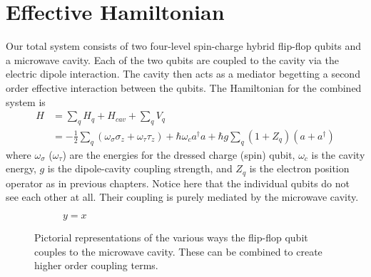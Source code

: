 \section{Effective Hamiltonian}\label{SEC:cavity_ham}

Our total system consists of two four-level spin-charge hybrid flip-flop qubits and a microwave cavity.
Each of the two qubits are coupled to the cavity via the electric dipole interaction.
The cavity then acts as a mediator begetting a second order effective interaction between the qubits.
The Hamiltonian for the combined system is
\begin{align}\label{EQ:cavity_hamiltonian}
    H & = \sum_q H_q + H_{cav} + \sum_q V_q \nonumber                                                                                        \\
      & = -\frac{1}{2}\sum_q (\omega_\sigma \sigma_z + \omega_\tau \tau_z) + \hbar\omega_c a^\dagger a + \hbar g \sum_q (1+Z_q)(a+a^\dagger)
\end{align}
where $\omega_\sigma$ ($\omega_\tau$) are the energies for the dressed charge (spin) qubit, $\omega_c$ is the cavity energy, $g$ is the dipole-cavity coupling strength, and $Z_q$ is the electron position operator as in previous chapters.
Notice here that the individual qubits do not see each other at all.
Their coupling is purely mediated by the microwave cavity.

\begin{figure}[htbp]
    \centering
    \begin{subfigure}[b]{0.3\textwidth}
        \centering
        
        \caption{$y=x$}
        \label{fig:y equals x}
    \end{subfigure}
    \caption[Flip-flop qubit - cavity coupling diagrams.]{Pictorial representations of the various ways the flip-flop qubit couples to the microwave cavity. These can be combined to create higher order coupling terms.}
    \label{FIG:qubit-cavity-coupling-1st-order-diagrams}
\end{figure}

